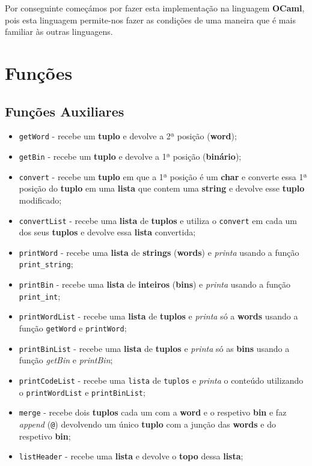 \documentclass[11pt]{article}   %
\begin{document}
Por conseguinte começámos por fazer esta implementação na linguagem \textbf{OCaml}, pois esta
linguagem permite-nos fazer as condições de uma maneira que é mais familiar às outras linguagens.
\newpage
\section{Funções}

\subsection{Funções Auxiliares}

\begin{itemize}
    \item \verb|getWord| - recebe um \textbf{tuplo} e devolve a 2ª posição (\textbf{word});
    \item \verb|getBin| - recebe um \textbf{tuplo} e devolve a 1ª posição (\textbf{binário});
    \item \verb|convert| - recebe um \textbf{tuplo} em que a 1ª posição é um \textbf{char} e 
    converte essa 1ª posição do \textbf{tuplo} em uma \textbf{lista} que contem uma \textbf{string}
    e devolve esse \textbf{tuplo} modificado;
    \item \verb|convertList| - recebe uma \textbf{lista} de \textbf{tuplos} e utiliza o \verb|convert|
    em cada um dos seus \textbf{tuplos} e devolve essa \textbf{lista} convertida;
    \item \verb|printWord| - recebe uma \textbf{lista} de \textbf{strings} (\textbf{words}) e 
    \textit{printa} usando a função \verb|print_string|;
    \item \verb|printBin| - recebe uma \textbf{lista} de \textbf{inteiros} (\textbf{bins}) e 
    \textit{printa} usando a função \verb|print_int|;
    \item \verb|printWordList| - recebe uma \textbf{lista} de \textbf{tuplos} e \textit{printa} só a 
    \textbf{words} usando a função \verb|getWord| e \verb|printWord|;
    \item \verb|printBinList| - recebe uma \textbf{lista} de \textbf{tuplos} e \textit{printa} só as 
    \textbf{bins} usando a função \textit{getBin} e \textit{printBin};
    \item \verb|printCodeList| - recebe uma \verb|lista| de \verb|tuplos| e \textit{printa} o conteúdo
    utilizando o \verb|printWordList| e \verb|printBinList|;
    \item \verb|merge| - recebe dois \textbf{tuplos} cada um com a \textbf{word} e o respetivo \textbf{bin}
    e faz \textit{append} (\verb|@|) devolvendo um único \textbf{tuplo} com a junção das \textbf{words} e 
    do respetivo \textbf{bin};
    \item \verb|listHeader| - recebe uma \textbf{lista} e devolve o \textbf{topo} dessa \textbf{lista};
\end{itemize}
\end{document}
